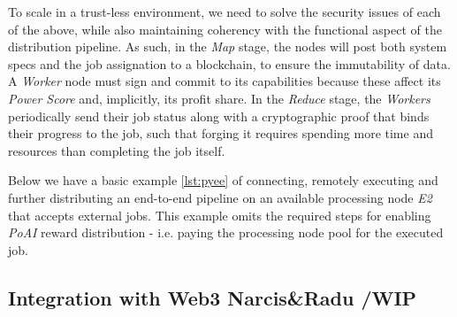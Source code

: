 \documentclass{article}
\begin{document}
To scale in a trust-less environment, we need to solve the security issues of each of the above, while also maintaining coherency with the functional aspect of the distribution pipeline. As such, in the \textit{Map} stage, the nodes will post both system specs and the job assignation to a blockchain, to ensure the immutability of data. A \textit{Worker} node must sign and commit to its capabilities because these affect its \textit{Power Score} and, implicitly, its profit share. In the \textit{Reduce} stage, the \textit{Workers} periodically send their job status along with a cryptographic proof \cite{cryptographic proof} that binds their progress to the job, such that forging it requires spending more time and resources than completing the job itself.



Below we have a basic example \ref{lst:pyee} of connecting, remotely executing and further distributing an end-to-end pipeline on an available processing node \textit{E2} that accepts external jobs. This example omits the required steps for enabling \textit{PoAI} reward distribution - i.e. paying the processing node pool for the executed job.

\subsection{Integration with Web3 Narcis\&Radu /WIP}
\end{document}
